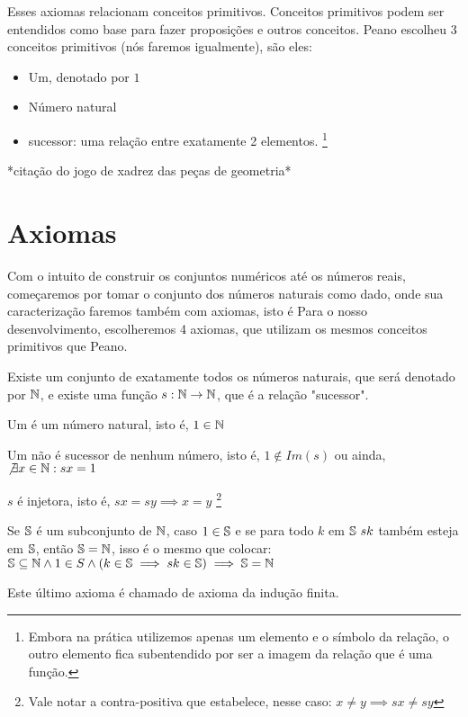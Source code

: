 \documentclass[../main.tex]{subfiles}
\begin{document}
Esses axiomas relacionam conceitos primitivos. Conceitos primitivos podem ser entendidos como base para fazer proposições e outros conceitos. Peano escolheu 3 conceitos primitivos (nós faremos igualmente), são eles:
\begin{itemize}
    \item Um, denotado por $1$
    \item Número natural
    \item sucessor: uma relação entre exatamente 2 elementos. \footnote{Embora na prática utilizemos apenas um elemento e o símbolo da relação, o outro elemento fica subentendido por ser a imagem da relação que é uma função.}
\end{itemize}

*citação do jogo de xadrez das peças de geometria*


\section{Axiomas}
Com o intuito de construir os conjuntos numéricos até os números reais, começaremos por tomar o conjunto dos números naturais como dado, onde sua caracterização faremos também com axiomas, isto é
Para o nosso desenvolvimento, escolheremos 4 axiomas, que utilizam os mesmos conceitos primitivos que Peano.
\begin{axi}\label{axi-existe-n-s}
    Existe um conjunto de exatamente todos os números naturais, que será denotado por $\N$, e existe uma função $s: \N \rightarrow \N$, que é a relação "sucessor". 
\end{axi} %
\begin{axi}\label{axi-um-natural}
    Um é um número natural, isto é, $1 \in \N$
\end{axi}
\begin{axi}\label{axi-um-nao-sucessor}
    Um não é sucessor de nenhum número, isto é, $1 \not \in Im(s)$ ou ainda, $\not \exists x \in \N : sx = 1$
\end{axi}
\begin{axi}\label{axi-s-injetora}
    $s$ é injetora, isto é, $sx = sy \implies x = y$ \footnote{Vale notar a contra-positiva que estabelece, nesse caso: $x \neq y \implies sx \neq sy$}
\end{axi}
\begin{axi}\label{axi-ind-finita}
    Se $\S$ é um subconjunto de $\N$, caso $1 \in \S$ e se para todo $k$ em $\S\ sk$ também esteja em $\S$, então $\S = \N$, isso é o mesmo que colocar:
     $\S \subseteq \N \land 1 \in S \land ( k \in \S \implies sk \in \S) \implies \S = \N$
\end{axi}
Este último axioma é chamado de axioma da indução finita.
\end{document}
